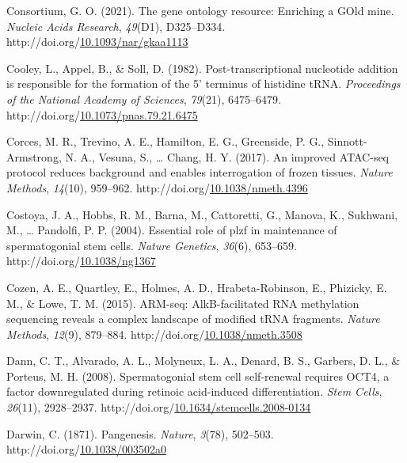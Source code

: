 \documentclass[12pt,twoside]{reedthesis}
\newlength{\cslhangindent}
\newenvironment{CSLReferences}[2] %
 {%
  \setlength{\parindent}{0pt}
  \ifodd #1 \everypar{\setlength{\hangindent}{\cslhangindent}}\ignorespaces\fi
  \ifnum #2 > 0
  \setlength{\parskip}{#2\baselineskip}
  \fi
 }%
 {}
\begin{document}
\begin{CSLReferences}{1}{0}
\leavevmode{}%
Consortium, G. O. (2021). The gene ontology resource: Enriching a GOld mine. \emph{Nucleic Acids Research}, \emph{49}(D1), D325--D334. http://doi.org/\href{https://doi.org/10.1093/nar/gkaa1113}{10.1093/nar/gkaa1113}

\leavevmode{}%
Cooley, L., Appel, B., \& Soll, D. (1982). Post-transcriptional nucleotide addition is responsible for the formation of the 5' terminus of histidine tRNA. \emph{Proceedings of the National Academy of Sciences}, \emph{79}(21), 6475--6479. http://doi.org/\href{https://doi.org/10.1073/pnas.79.21.6475}{10.1073/pnas.79.21.6475}

\leavevmode{}%
Corces, M. R., Trevino, A. E., Hamilton, E. G., Greenside, P. G., Sinnott-Armstrong, N. A., Vesuna, S., \ldots{} Chang, H. Y. (2017). An improved ATAC-seq protocol reduces background and enables interrogation of frozen tissues. \emph{Nature Methods}, \emph{14}(10), 959--962. http://doi.org/\href{https://doi.org/10.1038/nmeth.4396}{10.1038/nmeth.4396}

\leavevmode{}%
Costoya, J. A., Hobbs, R. M., Barna, M., Cattoretti, G., Manova, K., Sukhwani, M., \ldots{} Pandolfi, P. P. (2004). Essential role of plzf in maintenance of spermatogonial stem cells. \emph{Nature Genetics}, \emph{36}(6), 653--659. http://doi.org/\href{https://doi.org/10.1038/ng1367}{10.1038/ng1367}

\leavevmode{}%
Cozen, A. E., Quartley, E., Holmes, A. D., Hrabeta-Robinson, E., Phizicky, E. M., \& Lowe, T. M. (2015). ARM-seq: AlkB-facilitated RNA methylation sequencing reveals a complex landscape of modified tRNA fragments. \emph{Nature Methods}, \emph{12}(9), 879--884. http://doi.org/\href{https://doi.org/10.1038/nmeth.3508}{10.1038/nmeth.3508}

\leavevmode{}%
Dann, C. T., Alvarado, A. L., Molyneux, L. A., Denard, B. S., Garbers, D. L., \& Porteus, M. H. (2008). Spermatogonial stem cell self-renewal requires OCT4, a factor downregulated during retinoic acid-induced differentiation. \emph{Stem Cells}, \emph{26}(11), 2928--2937. http://doi.org/\href{https://doi.org/10.1634/stemcells.2008-0134}{10.1634/stemcells.2008-0134}

\leavevmode{}%
Darwin, C. (1871). Pangenesis. \emph{Nature}, \emph{3}(78), 502--503. http://doi.org/\href{https://doi.org/10.1038/003502a0}{10.1038/003502a0}


\end{CSLReferences}
\end{document}
